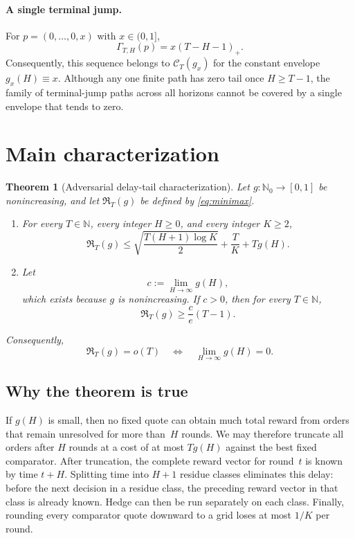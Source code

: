 \documentclass[11pt]{article}
\newtheorem{theorem}{Theorem}
\theoremstyle{remark}
\newcommand{\N}{\mathbb{N}}
\newcommand{\C}{\mathcal{C}}
\newcommand{\Reg}{\mathfrak{R}}
\newcommand{\GammaTail}{\Gamma}
\begin{document}
\paragraph{A single terminal jump.}
For $p=(0,\ldots,0,x)$ with $x\in(0,1]$,
\[
    \GammaTail_{T,H}(p)
    =
    x(T-H-1)_+.
\]
Consequently, this sequence belongs to $\C_T(g_x)$ for the constant envelope
$g_x(H)\equiv x$.  Although any one finite path has zero tail once
$H\ge T-1$, the family of terminal-jump paths across all horizons cannot be
covered by a single envelope that tends to zero.

\section{Main characterization}

\begin{theorem}[Adversarial delay-tail characterization]\label{thm:main}
Let $g:\N_0\to[0,1]$ be nonincreasing, and let $\Reg_T(g)$ be defined by
\eqref{eq:minimax}.

\begin{enumerate}[label=(\roman*)]
    \item For every $T\in\N$, every integer $H\ge0$, and every integer $K\ge2$,
    \begin{equation}\label{eq:upper-main}
        \Reg_T(g)
        \le
        \sqrt{\frac{T(H+1)\log K}{2}}
        +\frac{T}{K}
        +Tg(H).
    \end{equation}

    \item Let
    \[
        c:=\lim_{H\to\infty}g(H),
    \]
    which exists because $g$ is nonincreasing.  If $c>0$, then for every
    $T\in\N$,
    \begin{equation}\label{eq:lower-main}
        \Reg_T(g)
        \ge
        \frac{c}{e}(T-1).
    \end{equation}
\end{enumerate}
Consequently,
\begin{equation}\label{eq:iff}
    \boxed{
    \Reg_T(g)=o(T)
    \quad\Longleftrightarrow\quad
    \lim_{H\to\infty}g(H)=0.
    }
\end{equation}
\end{theorem}

\subsection*{Why the theorem is true}

If $g(H)$ is small, then no fixed quote can obtain much total reward from orders
that remain unresolved for more than~$H$ rounds.  We may therefore truncate all
orders after $H$ rounds at a cost of at most $Tg(H)$ against the best fixed
comparator.  After truncation, the complete reward vector for round~$t$ is known
by time $t+H$.  Splitting time into $H+1$ residue classes eliminates this delay:
before the next decision in a residue class, the preceding reward vector in that
class is already known.  Hedge can then be run separately on each class.  Finally,
rounding every comparator quote downward to a grid loses at most $1/K$ per round.
\end{document}
